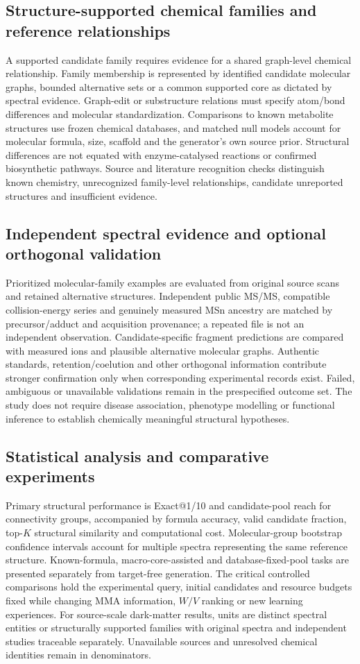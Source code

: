 \documentclass[11pt]{article}
\begin{document}
\subsection*{Structure-supported chemical families and reference relationships}
A supported candidate family requires evidence for a shared graph-level chemical relationship. Family membership is represented by identified candidate molecular graphs, bounded alternative sets or a common supported core as dictated by spectral evidence. Graph-edit or substructure relations must specify atom/bond differences and molecular standardization. Comparisons to known metabolite structures use frozen chemical databases, and matched null models account for molecular formula, size, scaffold and the generator's own source prior. Structural differences are not equated with enzyme-catalysed reactions or confirmed biosynthetic pathways. Source and literature recognition checks distinguish known chemistry, unrecognized family-level relationships, candidate unreported structures and insufficient evidence.

\subsection*{Independent spectral evidence and optional orthogonal validation}
Prioritized molecular-family examples are evaluated from original source scans and retained alternative structures. Independent public MS/MS, compatible collision-energy series and genuinely measured MSn ancestry are matched by precursor/adduct and acquisition provenance; a repeated file is not an independent observation. Candidate-specific fragment predictions are compared with measured ions and plausible alternative molecular graphs. Authentic standards, retention/coelution and other orthogonal information contribute stronger confirmation only when corresponding experimental records exist. Failed, ambiguous or unavailable validations remain in the prespecified outcome set. The study does not require disease association, phenotype modelling or functional inference to establish chemically meaningful structural hypotheses.

\subsection*{Statistical analysis and comparative experiments}
Primary structural performance is Exact@1/10 and candidate-pool reach for connectivity groups, accompanied by formula accuracy, valid candidate fraction, top-\(K\) structural similarity and computational cost. Molecular-group bootstrap confidence intervals account for multiple spectra representing the same reference structure. Known-formula, macro-core-assisted and database-fixed-pool tasks are presented separately from target-free generation. The critical controlled comparisons hold the experimental query, initial candidates and resource budgets fixed while changing MMA information, \(W/V\) ranking or new learning experiences. For source-scale dark-matter results, units are distinct spectral entities or structurally supported families with original spectra and independent studies traceable separately. Unavailable sources and unresolved chemical identities remain in denominators.
\end{document}
